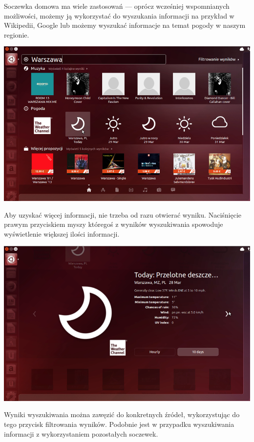 Soczewka domowa ma wiele zastosowań --- oprócz wcześniej wspomnianych możliwości, możemy ją wykorzystać do wyszukania informacji na przykład w Wikipedii, Google lub możemy wyszukać informacje na temat pogody w naszym regionie.
\clearpage
\begin{center}
	\includegraphics[width=\linewidth]{images/unity_dash_wyszukiwanie.png}
\end{center}

Aby uzyskać więcej informacji, nie trzeba od razu otwierać wyniku. Naciśnięcie prawym przyciskiem myszy któregoś z wyników wyszukiwania spowoduje wyświetlenie większej ilości informacji.

\begin{center}
	\includegraphics[width=\linewidth]{images/unity_dash_wyszukiwanie2.png}
\end{center}

Wyniki wyszukiwania można zawęzić do konkretnych źródeł, wykorzystując do tego przycisk filtrowania wyników. Podobnie jest w przypadku wyszukiwania informacji z wykorzystaniem pozostałych soczewek.

